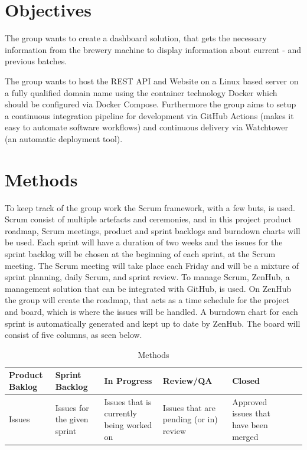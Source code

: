 \section{Objectives}
The group wants to create a dashboard solution, that gets the necessary
information from the brewery machine to display information about current - and
previous batches.

The group wants to host the REST API and Website on a Linux based server on a
fully qualified domain name using the container technology Docker which should
be configured via Docker Compose. Furthermore the group aims to setup a
continuous integration pipeline for development via GitHub Actions (makes it
easy to automate software workflows) and continuous delivery via Watchtower (an
automatic deployment tool).

\section{Methods}
To keep track of the group work the Scrum framework, with a few buts, is used.
Scrum consist of multiple artefacts and ceremonies, and in this project product
roadmap, Scrum meetings, product and sprint backlogs and burndown charts will
be used. Each sprint will have a duration of two weeks and the issues for the
sprint backlog will be chosen at the beginning of each sprint, at the Scrum
meeting. The Scrum meeting will take place each Friday and will be a mixture of
sprint planning, daily Scrum, and sprint review. To manage Scrum, ZenHub, a
management solution that can be integrated with GitHub, is used. On ZenHub the
group will create the roadmap, that acts as a time schedule for the project and
board, which is where the issues will be handled. A burndown chart for each
sprint is automatically generated and kept up to date by ZenHub. The board will
consist of five columns, as seen below.

\begin{table}[H]
    \begin{tabularx}{\textwidth}{|>{\RaggedRight}X|>{\RaggedRight}X|>{\RaggedRight}X|>{\RaggedRight}X|>{\RaggedRight}X|>{\RaggedRight}X|>{\RaggedRight}X|}
        \hline                             
        Product Baklog & Sprint Backlog & In Progress & Review/QA & Closed \\
        \hline
        Issues & Issues for the given sprint & Issues that is currently being worked on & Issues that are pending (or in) review & Approved issues that have been merged    \\
        \hline
    \end{tabularx}
    \caption{Methods} 
    \label{table:Methods}
\end{table} 

